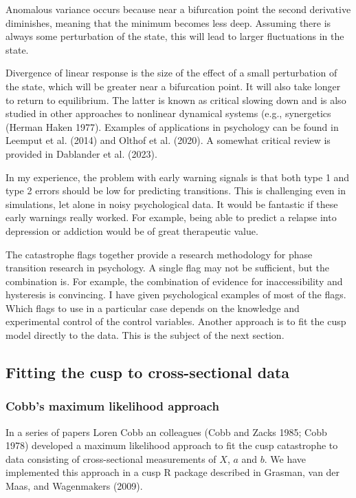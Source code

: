 \documentclass[
  letterpaper,
]{scrbook}
\begin{document}
Anomalous variance occurs because near a bifurcation point the second
derivative diminishes, meaning that the minimum becomes less deep.
Assuming there is always some perturbation of the state, this will lead
to larger fluctuations in the state.

Divergence of linear response is the size of the effect of a small
perturbation of the state, which will be greater near a bifurcation
point. It will also take longer to return to equilibrium. The latter is
known as critical slowing down and is also studied in other approaches
to nonlinear dynamical systems (e.g., synergetics (Herman Haken 1977).
Examples of applications in psychology can be found in Leemput et al.
(2014) and Olthof et al. (2020). A somewhat critical review is provided
in Dablander et al. (2023).

In my experience, the problem with early warning signals is that both
type 1 and type 2 errors should be low for predicting transitions. This
is challenging even in simulations, let alone in noisy psychological
data. It would be fantastic if these early warnings really worked. For
example, being able to predict a relapse into depression or addiction
would be of great therapeutic value.

The catastrophe flags together provide a research methodology for phase
transition research in psychology. A single flag may not be sufficient,
but the combination is. For example, the combination of evidence for
inaccessibility and hysteresis is convincing. I have given psychological
examples of most of the flags. Which flags to use in a particular case
depends on the knowledge and experimental control of the control
variables. Another approach is to fit the cusp model directly to the
data. This is the subject of the next section.

\hypertarget{fitting-the-cusp-to-cross-sectional-data}{%
\subsection{Fitting the cusp to cross-sectional
data}\label{fitting-the-cusp-to-cross-sectional-data}}

\hypertarget{cobbs-maximum-likelihood-approach}{%
\subsubsection{Cobb's maximum likelihood
approach}\label{cobbs-maximum-likelihood-approach}}

In a series of papers Loren Cobb an colleagues (Cobb and Zacks 1985;
Cobb 1978) developed a maximum likelihood approach to fit the cusp
catastrophe to data consisting of cross-sectional measurements of \(X\),
\(a\) and \(b\). We have implemented this approach in a cusp R package
described in Grasman, van der Maas, and Wagenmakers (2009).
\end{document}
